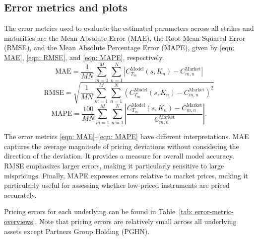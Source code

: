 \subsection{Error metrics and plots}
The error metrics used to evaluate the estimated parameters across all strikes and maturities are the Mean Absolute Error (MAE), the Root Mean-Squared Error (RMSE), and the Mean Absolute Percentage Error (MAPE), given by \eqref{eqn: MAE}, \eqref{eqn: RMSE}, and \eqref{eqn: MAPE}, respectively. 
\begin{equation}
    \text{MAE} = \frac{1}{MN} \sum_{m=1}^M\sum_{n=1}^N \left| C_{T_m}^{\text{Model}}(s,K_n) - C_{m,n}^{\text{Market}} \right|
    \label{eqn: MAE}
\end{equation}
\begin{equation}
    \text{RMSE} = \sqrt{\frac{1}{MN} \sum_{m=1}^M\sum_{n=1}^N \left(C_{T_m}^{\text{Model}}(s,K_n) - C_{m,n}^{\text{Market}}\right)^2}
    \label{eqn: RMSE}
\end{equation}
\begin{equation}
    \text{MAPE} = \frac{100}{MN} \sum_{m=1}^M\sum_{n=1}^N \left| \frac{C_{T_m}^{\text{Model}}(s,K_n) - C_{m,n}^{\text{Market}}}{C_{m,n}^{\text{Market}}} \right|.
    \label{eqn: MAPE}
\end{equation}

The error metrics \eqref{eqn: MAE}--\eqref{eqn: MAPE} have different interpretations. MAE captures the average magnitude of pricing deviations without considering the direction of the deviation. It provides a measure for overall model accuracy. RMSE emphasizes larger errors, making it particularly sensitive to large mispricings. Finally, MAPE expresses errors relative to market prices, making it particularly useful for assessing whether low-priced instruments are priced accurately. 

Pricing errors for each underlying can be found in Table~\ref{tab: error-metric-overviews}. Note that pricing errors are relatively small across all underlying assets except Partners Group Holding (PGHN).

\begingroup
\scriptsize
\renewcommand{\arraystretch}{0.98}
\setlength{\tabcolsep}{3pt}

\newcommand{\errormetricblock}[4]{%
    \begin{minipage}[t]{\linewidth}
        \vspace{0pt}
        \begin{tabular*}{\linewidth}{@{\extracolsep{\fill}}lr@{}}
            \toprule
            \multicolumn{2}{c}{\textbf{#1}} \\
            \midrule
            Metric & Value \\
            \midrule
            MAE & $#2$ \\
            RMSE & $#3$ \\
            MAPE (\%) & $#4$ \\
            \bottomrule
        \end{tabular*}
    \end{minipage}%
}

